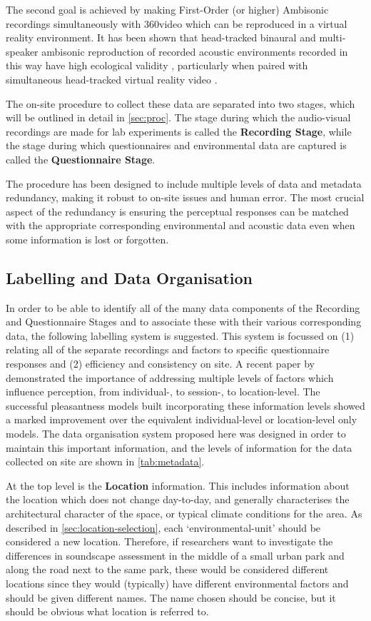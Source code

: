  The second goal is achieved by making First-Order (or higher) Ambisonic recordings simultaneously with 360\degree video which can be reproduced in a virtual reality environment. It has been shown that head-tracked binaural and multi-speaker ambisonic reproduction of recorded acoustic environments recorded in this way have high ecological validity \citep{Davies2014Soundscape}, particularly when paired with simultaneous head-tracked virtual reality video \citep{DeCoensel2017Urban,Hong2018Quality}.

 The on-site procedure to collect these data are separated into two stages, which will be outlined in detail in \cref{sec:proc}. The stage during which the audio-visual recordings are made for lab experiments is called the \textbf{Recording Stage}, while the stage during which questionnaires and environmental data are captured is called the \textbf{Questionnaire Stage}.

 The procedure has been designed to include multiple levels of data and metadata redundancy, making it robust to on-site issues and human error. The most crucial aspect of the redundancy is ensuring the perceptual responses can be matched with the appropriate corresponding environmental and acoustic data even when some information is lost or forgotten.

 \subsection{Labelling and Data Organisation}
   \label{section:metadata}
   In order to be able to identify all of the many data components of the Recording and Questionnaire Stages and to associate these with their various corresponding data, the following labelling system is suggested. This system is focussed on (1) relating all of the separate recordings and factors to specific questionnaire responses and (2) efficiency and consistency on site. A recent paper by \citet{Aumond2017Modeling} demonstrated the importance of addressing multiple levels of factors which influence perception, from individual-, to session-, to location-level. The successful pleasantness models built incorporating these information levels showed a marked improvement over the equivalent individual-level or location-level only models. The data organisation system proposed here was designed in order to maintain this important information, and the levels of information for the data collected on site are shown in \cref{tab:metadata}.

   At the top level is the \textbf{Location} information. This includes information about the location which does not change day-to-day, and generally characterises the architectural character of the space, or typical climate conditions for the area. As described in \cref{sec:location-selection}, each `\gls{environmental-unit}' should be considered a new location. Therefore, if researchers want to investigate the differences in soundscape assessment in the middle of a small urban park and along the road next to the same park, these would be considered different locations since they would (typically) have different environmental factors and should be given different names. The name chosen should be concise, but it should be obvious what location is referred to.


